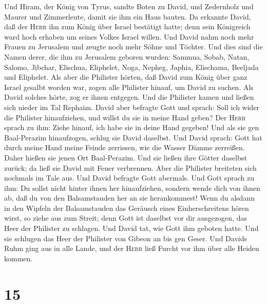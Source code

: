  Und Hiram, der König von Tyrus, sandte Boten zu David,
und Zedernholz und Maurer und Zimmerleute, damit sie ihm ein Haus
bauten.  Da erkannte David, daß der \textsc{Herr} ihn zum
König über Israel bestätigt hatte; denn sein Königreich ward hoch
erhaben um seines Volkes Israel willen.  Und David nahm
noch mehr Frauen zu Jerusalem und zeugte noch mehr Söhne und Töchter.
 Und dies sind die Namen derer, die ihm zu Jerusalem
geboren wurden: Sammua, Sobab, Natan, Salomo,  Jibchar,
Elischua, Eliphelet,  Noga, Nepheg, Japhia, 
Elischama, Beeljada und Eliphelet.  Als aber die Philister
hörten, daß David zum König über ganz Israel gesalbt worden war, zogen
alle Philister hinauf, um David zu suchen. Als David solches hörte, zog
er ihnen entgegen.  Und die Philister kamen und ließen
sich nieder im Tal Rephaim.  David aber befragte Gott und
sprach: Soll ich wider die Philister hinaufziehen, und willst du sie in
meine Hand geben? Der \textsc{Herr} sprach zu ihm: Ziehe hinauf, ich
habe sie in deine Hand gegeben!  Und als sie gen
Baal-Perazim hinaufzogen, schlug sie David daselbst. Und David sprach:
Gott hat durch meine Hand meine Feinde zerrissen, wie die Wasser Dämme
zerreißen. Daher hießen sie jenen Ort Baal-Perazim.  Und
sie ließen ihre Götter daselbst zurück; da ließ sie David mit Feuer
verbrennen.  Aber die Philister breiteten sich nochmals
im Tale aus.  Und David befragte Gott abermals. Und Gott
sprach zu ihm: Du sollst nicht hinter ihnen her hinaufziehen, sondern
wende dich von ihnen ab, daß du von den Balsamstauden her an sie
herankommest!  Wenn du alsdann in den Wipfeln der
Balsamstauden das Geräusch eines Einherschreitens hören wirst, so ziehe
aus zum Streit; denn Gott ist daselbst vor dir ausgezogen, das Heer der
Philister zu schlagen.  Und David tat, wie Gott ihm
geboten hatte. Und sie schlugen das Heer der Philister von Gibeon an bis
gen Geser.  Und Davids Ruhm ging aus in alle Lande, und
der \textsc{Herr} ließ Furcht vor ihm über alle Heiden kommen.

\hypertarget{section-14}{%
\section{15}\label{section-14}}

